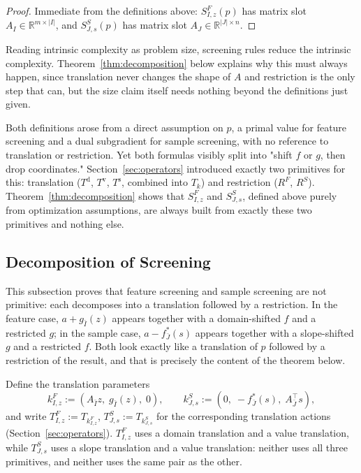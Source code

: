 \begin{proof}
Immediate from the definitions above: \(S^F_{I,z}(p)\) has matrix slot
\(A_I\in\mathbb R^{m\times|I|}\), and \(S^S_{J,s}(p)\) has matrix slot
\(A_J\in\mathbb R^{|J|\times n}\).
\end{proof}

Reading intrinsic complexity as problem size, screening rules reduce
the intrinsic complexity. Theorem~\ref{thm:decomposition} below
explains why this must always happen, since translation never changes
the shape of \(A\) and restriction is the only step that can, but the
size claim itself needs nothing beyond the definitions just given.

Both definitions arose from a direct assumption on \(p\), a primal
value for feature screening and a dual subgradient for sample
screening, with no reference to translation or restriction. Yet both
formulas visibly split into "shift \(f\) or \(g\), then drop
coordinates." Section~\ref{sec:operators} introduced exactly two
primitives for this: translation (\(T^{\mathrm d}\), \(T^{\mathrm v}\),
\(T^{\mathrm s}\), combined into \(T_k\)) and restriction (\(R^F\),
\(R^S\)). Theorem~\ref{thm:decomposition} shows that \(S^F_{I,z}\) and
\(S^S_{J,s}\), defined above purely from optimization assumptions, are
always built from exactly these two primitives and nothing else.

\subsection{Decomposition of Screening}

This subsection proves that feature screening and sample screening are
not primitive: each decomposes into a translation followed by a
restriction. In the feature case, \(a+g_{\bar I}(z)\) appears together
with a domain-shifted \(f\) and a restricted \(g\); in the sample case,
\(a-f_{\bar J}^*(s)\) appears together with a slope-shifted \(g\) and a
restricted \(f\). Both look exactly like a translation of \(p\)
followed by a restriction of the result, and that is precisely the
content of the theorem below.

Define the translation parameters
\[
k^{F}_{I,z}:=(A_{\bar I}z,\;g_{\bar I}(z),\;0),
\qquad
k^{S}_{J,s}:=(0,\;-f_{\bar J}^{*}(s),\;A_{\bar J}^{\top}s),
\]
and write \(T^{F}_{I,z}:=T_{k^F_{I,z}}\), \(T^{S}_{J,s}:=T_{k^S_{J,s}}\)
for the corresponding translation actions (Section~\ref{sec:operators}).
\(T^F_{I,z}\) uses a domain translation and a value translation, while
\(T^S_{J,s}\) uses a slope translation and a value translation: neither
uses all three primitives, and neither uses the same pair as the other.

